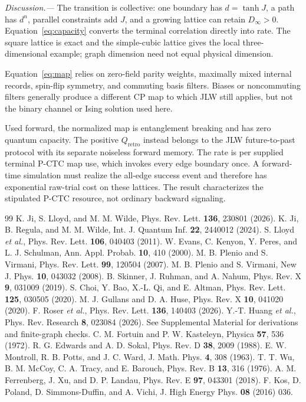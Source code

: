 \documentclass[aps,prl,reprint,amsmath,amssymb,superscriptaddress,nofootinbib,floatfix]{revtex4-2}
\newcommand{\Qretro}{Q_{\mathrm{retro}}}
\begin{document}
\textit{Discussion.---}
The transition is collective: one boundary has $d=\tanh J$, a path has $d^n$, parallel constraints add $J$, and a growing lattice can retain $D_\infty>0$. Equation~\eqref{eq:capacity} converts the terminal correlation directly into rate. The square lattice is exact and the simple-cubic lattice gives the local three-dimensional example; graph dimension need not equal physical dimension.

Equation~\eqref{eq:map} relies on zero-field parity weights, maximally mixed internal records, spin-flip symmetry, and commuting basis filters. Biases or noncommuting filters generally produce a different CP map to which JLW still applies, but not the binary channel or Ising solution used here.

Used forward, the normalized map is entanglement breaking and has zero quantum capacity. The positive $\Qretro$ instead belongs to the JLW future-to-past protocol with its separate noiseless forward memory. The rate is per supplied terminal P-CTC map use, which invokes every edge boundary once. A forward-time simulation must realize the all-edge success event and therefore has exponential raw-trial cost on these lattices. The result characterizes the stipulated P-CTC resource, not ordinary backward signaling.

\begin{thebibliography}{99}
 K. Ji, S. Lloyd, and M. M. Wilde, Phys. Rev. Lett. \textbf{136}, 230801 (2026).
 K. Ji, B. Regula, and M. M. Wilde, Int. J. Quantum Inf. \textbf{22}, 2440012 (2024).
 S. Lloyd \textit{et al.}, Phys. Rev. Lett. \textbf{106}, 040403 (2011).
 W. Evans, C. Kenyon, Y. Peres, and L. J. Schulman, Ann. Appl. Probab. \textbf{10}, 410 (2000).
 M. B. Plenio and S. Virmani, Phys. Rev. Lett. \textbf{99}, 120504 (2007).
 M. B. Plenio and S. Virmani, New J. Phys. \textbf{10}, 043032 (2008).
 B. Skinner, J. Ruhman, and A. Nahum, Phys. Rev. X \textbf{9}, 031009 (2019).
 S. Choi, Y. Bao, X.-L. Qi, and E. Altman, Phys. Rev. Lett. \textbf{125}, 030505 (2020).
 M. J. Gullans and D. A. Huse, Phys. Rev. X \textbf{10}, 041020 (2020).
 F. Roser \textit{et al.}, Phys. Rev. Lett. \textbf{136}, 140403 (2026).
 Y.-T. Huang \textit{et al.}, Phys. Rev. Research \textbf{8}, 023084 (2026).
 See Supplemental Material for derivations and finite-graph checks.
 C. M. Fortuin and P. W. Kasteleyn, Physica \textbf{57}, 536 (1972).
 R. G. Edwards and A. D. Sokal, Phys. Rev. D \textbf{38}, 2009 (1988).
 E. W. Montroll, R. B. Potts, and J. C. Ward, J. Math. Phys. \textbf{4}, 308 (1963).
 T. T. Wu, B. M. McCoy, C. A. Tracy, and E. Barouch, Phys. Rev. B \textbf{13}, 316 (1976).
 A. M. Ferrenberg, J. Xu, and D. P. Landau, Phys. Rev. E \textbf{97}, 043301 (2018).
 F. Kos, D. Poland, D. Simmons-Duffin, and A. Vichi, J. High Energy Phys. \textbf{08} (2016) 036.
\end{thebibliography}
\end{document}
